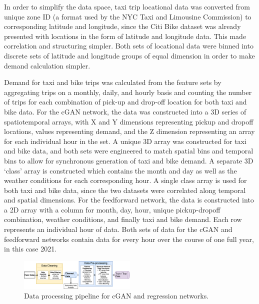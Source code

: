 \documentclass[conference]{IEEEtran}
\begin{document}
In order to simplify the data space, taxi trip locational data was converted from unique zone ID (a format used by the NYC Taxi 
and Limousine Commission) to corresponding latitude and longitude, since the Citi Bike dataset was already presented with 
locations in the form of latitude and longitude data. This made correlation and structuring simpler. Both sets of locational 
data were binned into discrete sets of latitude and longitude groups of equal dimension in order to make demand calculation 
simpler. 

Demand for taxi and bike trips was calculated from the feature sets by aggregating trips on a monthly, daily, and hourly basis 
and counting the number of trips for each combination of pick-up and drop-off location for both taxi and bike data. For the cGAN 
network, the data was constructed into a 3D series of spatiotemporal arrays, with X and Y dimensions representing pickup and 
dropoff locations, values representing demand, and the Z dimension representing an array for each individual hour in the set. 
A unique 3D array was constructed for taxi and bike data, and both sets were engineered to match spatial bins and temporal bins 
to allow for synchronous generation of taxi and bike demand. A separate 3D ‘class’ array is constructed which contains the month
 and day as well as the weather conditions for each corresponding hour. A single class array is used for both taxi and bike data,
  since the two datasets were correlated along temporal and spatial dimensions. For the feedforward network, the data is 
  constructed into a 2D array with a column for month, day, hour, unique pickup-dropoff combination, weather conditions, and 
  finally taxi and bike demand. Each row represents an individual hour of data. Both sets of data for the cGAN and feedforward 
  networks contain data for every hour over the course of one full year, in this case 2021.

\begin{figure}[t]
  \centerline{\includegraphics[width=0.5\textwidth]{figs/dataPipeline.png}}
  \caption{Data processing pipeline for cGAN and regression networks.}
  \label{fig:data}
  \end{figure}
\end{document}
